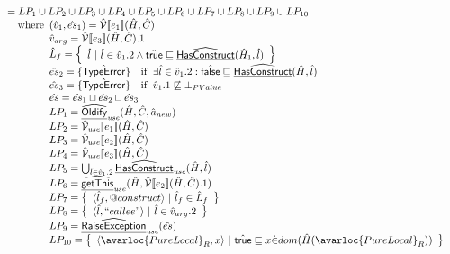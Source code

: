 \[\begin{array}{l}
  = LP_1 \cup LP_2 \cup LP_3 \cup LP_4 \cup LP_5 \cup LP_6 \cup LP_7 \cup LP_8 \cup LP_9 \cup LP_{10}\\
  \quad\wherec{
    (\hat{v}_1,\hat{es}_1) = \aV\lbr e_1\rbr(\hat{H},\hat{C}) \\
    \hat{v}_{arg} = \aV\lbr e_3\rbr(\hat{H},\hat{C}).1 \\
    \hat{L}_f = \set{ \hat{l} ~|~ \hat{l}\in \hat{v}_1.2 \land \atrue\sqsubseteq\ahf{HasConstruct}(\hat{H}_1,\hat{l})} \\
    \hat{es}_2 = \{\hat{\exc{TypeError}}\} \quad\ifc{\exists \hat{l}\in\hat{v}_1.2:\afalse\sqsubseteq\ahf{HasConstruct}(\hat{H},\hat{l})}\\
    \hat{es}_3 = \{\hat{\exc{TypeError}}\} \quad\ifc{\hat{v}_1.1\not\sqsubseteq\bot_{PValue}}\\
    \hat{es} = \hat{es}_1\sqcup\hat{es}_2\sqcup\hat{es}_3\\
    LP_1 = \ahf{Oldify}_{\it use}(\hat{H}, \hat{C}, \hat{a}_{new}) \\
    LP_2 = \aV_{\it use}\lbr e_1\rbr(\hat{H},\hat{C})\\
    LP_3 = \aV_{\it use}\lbr e_2\rbr(\hat{H},\hat{C})\\
    LP_4 = \aV_{\it use}\lbr e_3\rbr(\hat{H},\hat{C})\\
    LP_5 = \bigcup_{\hat{l}\in\hat{v}_1.2}\ahf{HasConstruct}_{\it use}(\hat{H},\hat{l})\\
    LP_6 = \ahf{getThis}_{\it use}(\hat{H}, \aV\lbr e_2\rbr(\hat{H},\hat{C}).1) \\
    LP_7 = \set{\langle \hat{l}_f, \varprop{construct}\rangle ~|~ \hat{l}_f\in\hat{L}_f}\\
    LP_8 = \set{\langle \hat{l}, ``callee"\rangle ~|~ \hat{l}\in \hat{v}_{arg}.2} \\
    LP_9 = \ahf{RaiseException}_{\it use}(\hat{es}) \\
    LP_{10} = \set{\langle \avarloc{PureLocal}_R, x \rangle ~|~ \atrue \sqsubseteq x \dot{\in} dom(\hat{H}(\avarloc{PureLocal}_R)) }
  }
  \\\\
\end{array}
\]
